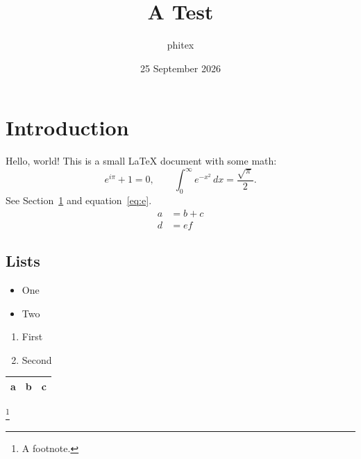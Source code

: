 \documentclass{article}
\title{A Test}\author{phitex}\date{25 September 2026}
\begin{document}
\maketitle
\tableofcontents
\section{Introduction}\label{sec:intro}
Hello, world! This is a small \LaTeX{} document with some math:
\begin{equation}\label{eq:e}
  e^{i\pi} + 1 = 0, \qquad \int_0^\infty e^{-x^2}\,dx = \frac{\sqrt{\pi}}{2}.
\end{equation}
See Section~\ref{sec:intro} and equation~\eqref{eq:e}.
\begin{align}
  a &= b + c \\ d &= e f
\end{align}
\subsection{Lists}
\begin{itemize}\item One \item Two\end{itemize}
\begin{enumerate}\item First \item Second\end{enumerate}
\begin{tabular}{|l|c|r|}\hline a & b & c\\ \hline\end{tabular}
\footnote{A footnote.}
\end{document}
